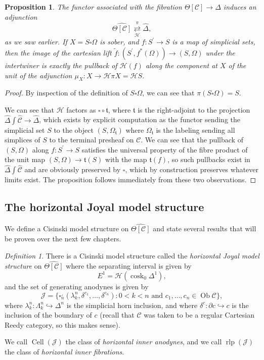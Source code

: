 \documentclass[leqno]{article}
\numberwithin{equation}{subsection}
\theoremstyle{plain}   %
\newtheorem{prop}[equation]{Proposition}
\theoremstyle{remark}
\newtheorem{defn}[equation]{Definition}
\theoremstyle{plain}
\DeclareMathOperator{\Ob}{Ob}
\newcommand{\psh}[1]{\ensuremath{\widehat{#1}}}
\newcommand{\C}{\ensuremath{\mathcal{C}}}
\newcommand{\cellset}{\ensuremath{\widehat{\Theta[\mathcal{C}]}}}
\newcommand{\ssetlab}{\ensuremath{\widehat{\Delta} \int \widehat{\mathcal{C}}}}
\begin{document}
\begin{prop}\label{pullbacksober}
	The functor associated with the fibration \(\Theta[\C]\to \Delta\) induces an adjunction 
	\[\cellset \underset{\mathscr{H}}{\overset{\pi}{\rightleftarrows}} \psh{\Delta} ,\]
	as we saw earlier. If \(X=S\square\Omega\) is sober, and \(f:S^\prime\to S\) is a map of simplicial sets, then the image of the cartesian lift \(\tilde{f}:(S^\prime, f^\ast(\Omega))\to (S,\Omega)\) under the intertwiner is exactly the pullback of \(\mathscr{H}(f)\) along the component at \(X\) of the unit of the adjunction \(\mu_X:X\to \mathscr{H}\pi X= \mathscr{H} S\).
\end{prop}
\begin{proof} 
	By inspection of the definition of \(S\square\Omega\), we can see that \(\pi(S\square\Omega)=S\).

	We can see that \(\mathscr{H}\) factors as \(\square\circ \mathfrak{t}\), where \(\mathfrak{t}\) is the right-adjoint to the projection \(\ssetlab\to \psh{\Delta}\), which exists by explicit computation as the functor sending the simplicial set \(S\) to the object \((S,\Omega_{\mathfrak{t}})\) where \(\Omega_{\mathfrak{t}}\) is the labeling sending all simplices of \(S\) to the terminal presheaf on \(\C\).   We can see that the pullback of \((S,\Omega)\) along \(f:S^\prime\to S\) satisfies the universal property of the fibre product of the unit map \((S,\Omega)\to \mathfrak{t}(S)\) with the map \(\mathfrak{t}(f)\), so such pullbacks exist in \(\ssetlab\) and are obviously preserved by \(\square\), which by construction preserves whatever limits exist. The proposition follows immediately from these two observations.
\end{proof}


\subsection{The horizontal Joyal model structure}
We define a Cisinski model structure on \(\cellset\) and state several results that will be proven over the next few chapters.

\begin{defn}
	There is a Cisinski model structure called the \emph{horizontal Joyal model structure} on \(\cellset\) where the separating interval is given by 
	\[E^1=\mathscr{H}(\operatorname{cosk}_0 \Delta^1),\]
	and the set of generating anodynes is given by
	\[\mathscr{J}=\{\square_n^\lrcorner(\lambda^n_k,\delta^{c_1},\dots,\delta^{c_n}) : 0<k<n \text{ and } c_1,\dots,c_n \in \Ob \C\},\]
	where \(\lambda^n_k:\Lambda^n_k\hookrightarrow \Delta^n\) is the simplicial horn inclusion, and where \(\delta^c:\partial c \hookrightarrow c\) is the inclusion of the boundary of \(c\) (recall that \(\C\) was taken to be a regular Cartesian Reedy category, so this makes sense).

	We call \(\operatorname{Cell}(\mathscr{J})\) the class of \emph{horizontal inner anodynes}, and we call \(\operatorname{rlp}(\mathscr{J})\) the class of \emph{horizontal inner fibrations}.
\end{defn}
\end{document}
